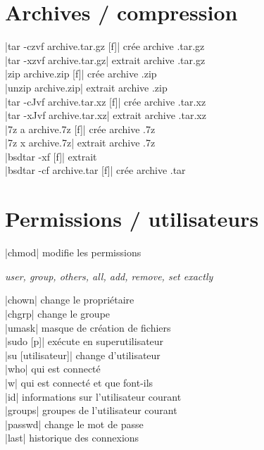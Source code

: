 \documentclass{article}
\newenvironment{cmdblock}{%
  \par\setlength{\parindent}{0pt}\setlength{\parskip}{0pt}%
  \RaggedRight%
}{\par}
\newlength{\cmdoptindent}
\newcommand{\cmdopt}[1]{%
  \hspace*{\cmdoptindent}%
  \begin{minipage}[t]{\dimexpr\linewidth-\cmdoptindent\relax}
    \RaggedRight \itshape #1%
  \end{minipage}\par
}
\begin{document}
\begin{multicols}{4}
\begin{tabbing}
    \end{tabbing}

    \section*{Archives / compression}
    \begin{cmdblock}
        \code|tar -czvf archive.tar.gz [f]| \quad crée archive .tar.gz \\
        \code|tar -xzvf archive.tar.gz| \quad extrait archive .tar.gz \\
        \code|zip archive.zip [f]| \quad crée archive .zip \\
        \code|unzip archive.zip| \quad extrait archive .zip \\
        \code|tar -cJvf archive.tar.xz [f]| \quad crée archive .tar.xz \\
        \code|tar -xJvf archive.tar.xz| \quad extrait archive .tar.xz \\
        \code|7z a archive.7z [f]| \quad crée archive .7z \\
        \code|7z x archive.7z| \quad extrait archive .7z \\
        \code|bsdtar -xf [f]| \quad extrait \\
        \code|bsdtar -cf archive.tar [f]| \quad crée archive .tar \\
    \end{cmdblock}

    \section*{Permissions / utilisateurs}

    \begin{cmdblock}
        \code|chmod| \quad modifie les permissions \\
        \cmdopt{ user,  group,  others,  all,
            \codx{+} add, \codx{-} remove, \codx{=} set exactly}
        \code|chown| \quad change le propriétaire \\
        \code|chgrp| \quad change le groupe \\
        \code|umask| \quad masque de création de fichiers \\
        \code|sudo [p]| \quad exécute en superutilisateur \\
        \code|su [utilisateur]| \quad change d'utilisateur \\
        \code|who| \quad qui est connecté \\
        \code|w| \quad qui est connecté et que font-ils \\
        \code|id| \quad informations sur l'utilisateur courant \\
        \code|groups| \quad groupes de l'utilisateur courant \\
        \code|passwd| \quad change le mot de passe \\
        \code|last| \quad historique des connexions \\
    \end{cmdblock}


\end{multicols}
\end{document}
